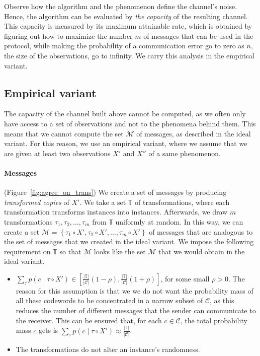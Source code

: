 Observe how the algorithm and the phenomenon define the channel's noise. Hence, the algorithm can be evaluated by \emph{the capacity} of the resulting channel. This capacity is measured by its maximum attainable rate, which is obtained by figuring out how to maximize the number $m$ of messages that can be used in the protocol, while making the probability of a communication error go to zero as $n$, the size of the observations, go to infinity. We carry this analysis in the empirical variant.

\subsection{Empirical variant}

The capacity of the channel built above cannot be computed, as we often only have access to a set of observations and not to the phenomena behind them. This means that we cannot compute the set $\mathcal{M}$ of messages, as described in the ideal variant. For this reason, we use an empirical variant, where we assume that we are given at least two observations $X'$ and $X''$ of a same phenomenon.

\paragraph{Messages} (Figure~\ref{fig:agree_on_trans}) We create a set of messages by producing \emph{transformed copies} of $X'$. We take a set $\mathbb{T}$ of transformations, where each transformation transforms instances into instances. Afterwards, we draw $m$ transformations  $\tau_1, \tau_2, \ldots, \tau_m$ from $\mathbb{T}$ uniformly at random. In this way, we can create a set $\mathcal{M} = \left\{\tau_1 \circ X', \tau_2 \circ X', \ldots, \tau_m \circ X'\right\}$ of messages that are analogous to the set of messages that we created in the ideal variant. We impose the following requirement on $\mathbb{T}$ so that $\mathcal{M}$ looks like the set $\mathcal{M}$ that we would obtain in the ideal variant.

\begin{itemize}
\item $\sum_{\tau} p(c \mid \tau \circ X') \in \left[\frac{\left|\mathbb{T}\right|}{\left|\mathcal{C}\right|}(1 - \rho), \frac{\left|\mathbb{T}\right|}{\left|\mathcal{C}\right|}(1 + \rho)\right]$, for some small $\rho > 0$. The reason for this assumption is that we we do not want the probability mass of all these codewords to be concentrated in a narrow subset of $\mathcal{C}$, as this reduces the number of different messages that the sender can communicate to the receiver. This can be ensured that, for each $c \in \mathcal{C}$, the total probability mass $c$ gets is $\sum_{\tau} p(c \mid \tau \circ X') \approx \frac{\left|\mathbb{T}\right|}{\left|\mathcal{C}\right|}$.
\item The transformations do not alter an instance's randomness. 
\end{itemize}

